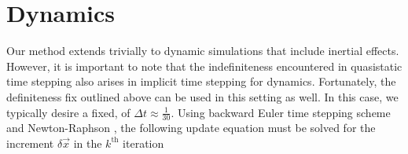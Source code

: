 
\section{Dynamics}
\label{sec:dynamics}
Our method extends trivially to dynamic simulations that include inertial
effects. However, it is important to note that the indefiniteness encountered in
quasistatic time stepping also arises in implicit time stepping for
dynamics. Fortunately, the definiteness fix outlined above can be used in this
setting as well.  In this case, we typically desire a fixed,  of
$\Delta{t}\approx\frac{1}{30}$. Using  backward Euler
time stepping scheme 
and 
Newton-Raphson , the following  update equation must be solved for the increment $\delta\vec{{x}}$ in the $k^\textrm{th}$ iteration
